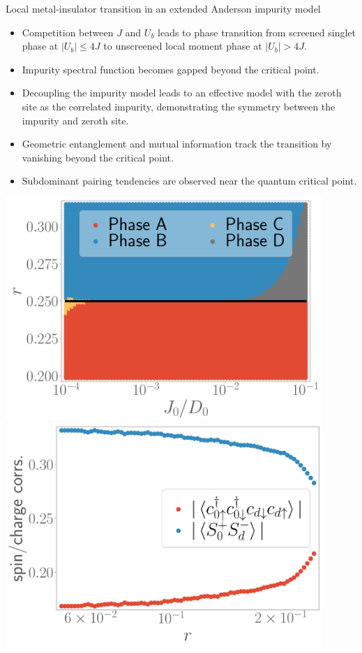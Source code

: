 \documentclass[10pt,aspectratio=169]{beamer}
\begin{document}
\begin{frame}{Local metal-insulator transition in an extended Anderson impurity model}
\hspace*{-40pt}
\begin{minipage}{0.65\textwidth}
\begin{itemize}
\item Competition between $J$ and $U_b$ leads to phase transition from screened singlet phase at \(|U_b| \leq 4J\) to unscreened local moment phase at \(|U_b| > 4J\).
\item Impurity spectral function becomes gapped beyond the critical point.
\item Decoupling the impurity model leads to an effective model with the zeroth site as the correlated impurity, demonstrating the symmetry between the impurity and zeroth site.
\item Geometric entanglement and mutual information track the transition by vanishing beyond the critical point.
\item Subdominant pairing tendencies are observed near the quantum critical point.
\end{itemize}
\end{minipage}
\hspace*{5pt}
\begin{minipage}{0.41\textwidth}
\includegraphics[width=0.9\textwidth]{phase-map-MIT.pdf}
\includegraphics[width=0.9\textwidth]{odlro_d0.pdf}
\end{minipage}
\hspace*{-40pt}
\end{frame}
\end{document}
